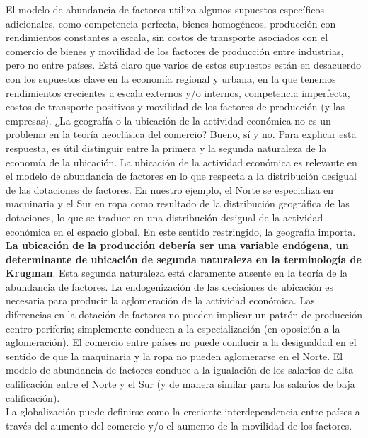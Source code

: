 El modelo de abundancia de factores utiliza algunos supuestos específicos adicionales, como competencia perfecta, bienes homogéneos, producción con rendimientos constantes a escala, sin costos de transporte asociados con el comercio de bienes y movilidad de los factores de producción entre industrias, pero no entre países. Está claro que varios de estos supuestos están en desacuerdo con los supuestos clave en la economía regional y urbana, en la que tenemos rendimientos crecientes a escala externos y/o internos, competencia imperfecta, costos de transporte positivos y movilidad de los factores de producción (y las empresas). ¿La geografía o la ubicación de la actividad económica no es un problema en la teoría neoclásica del comercio? Bueno, sí y no. Para explicar esta respuesta, es útil distinguir entre la primera y la segunda naturaleza de la economía de la ubicación. La ubicación de la actividad económica es relevante en el modelo de abundancia de factores en lo que respecta a la distribución desigual de las dotaciones de factores. En nuestro ejemplo, el Norte se especializa en maquinaria y el Sur en ropa como resultado de la distribución geográfica de las dotaciones, lo que se traduce en una distribución desigual de la actividad económica en el espacio global. En este sentido restringido, la geografía importa. \textbf{La ubicación de la producción debería ser una variable endógena, un determinante de ubicación de segunda naturaleza en la terminología de Krugman}. Esta segunda naturaleza está claramente ausente en la teoría de la abundancia de factores. La endogenización de las decisiones de ubicación es necesaria para producir la aglomeración de la actividad económica. Las diferencias en la dotación de factores no pueden implicar un patrón de producción centro-periferia; simplemente conducen a la especialización (en oposición a la aglomeración). El comercio entre países no puede conducir a la desigualdad en el sentido de que la maquinaria y la ropa no pueden aglomerarse en el Norte. El modelo de abundancia de factores conduce a la igualación de los salarios de alta calificación entre el Norte y el Sur (y de manera similar para los salarios de baja calificación).\\
La globalización puede definirse como la creciente interdependencia entre países a través del aumento del comercio y/o el aumento de la movilidad de los factores.\\

